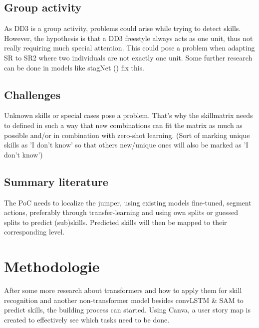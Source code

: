 \subsection{Group activity}

As DD3 is a group activity, problems could arise while trying to detect skills. However, the hypothesis is that a DD3 freestyle always acts as one unit, thus not really requiring much special attention. This could pose a problem when adapting SR to SR2 where two individuals are not exactly one unit. Some further research can be done in models like stagNet (\autocite{stagnet-volleybal}) fix this.

\subsection{Challenges}
\label{subsec:challenges}

Unknown skills or special cases pose a problem. That's why the skillmatrix needs to defined in such a way that new combinations can fit the matrix as much as possible and/or in combination with zero-shot learning. (Sort of marking unique skills as 'I don't know' so that others new/unique ones will also be marked as 'I don't know')


\subsection{Summary literature}
\label{subsec:summary literature}

The PoC needs to localize the jumper, using existing models fine-tuned, segment actions, preferably through transfer-learning and using own splits or guessed splits to predict (sub)skills.
Predicted skills will then be mapped to their corresponding level.



\section{Methodologie}%
\label{sec:methodologie}

After some more research about transformers and how to apply them for skill recognition and another non-transformer model besides convLSTM \& SAM to predict skills, the building process can started.
Using Canva, a user story map is created to effectively see which tasks need to be done. %

